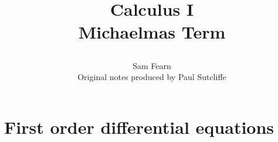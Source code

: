 \documentclass[12pt]{article}
\theoremstyle{definition}
\begin{document}
\title{
  Calculus I\\
  Michaelmas Term
\author{Sam Fearn \\ Original notes produced by Paul Sutcliffe }}
\date{}
\maketitle
\tableofcontents\newpage
%
\section{First order differential equations}






\end{document}
